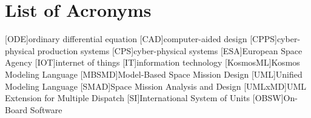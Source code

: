 \chapter*{List of Acronyms}
\begin{acronym}
    [ODE]{ordinary differential equation}
    [CAD]{computer-aided design}
    [CPPS]{cyber-physical production systems}
    [CPS]{cyber-physical systems}
    [ESA]{European Space Agency}
    [IOT]{internet of things}
    [IT]{information technology}
    [KosmosML]{Kosmos Modeling Language}
    [MBSMD]{Model-Based Space Mission Design}
    [UML]{Unified Modeling Language}
    [SMAD]{Space Mission Analysis and Design}
    [UMLxMD]{UML Extension for Multiple Dispatch}
    [SI]{International System of Units }
    [OBSW]{On-Board Software}
\end{acronym}
